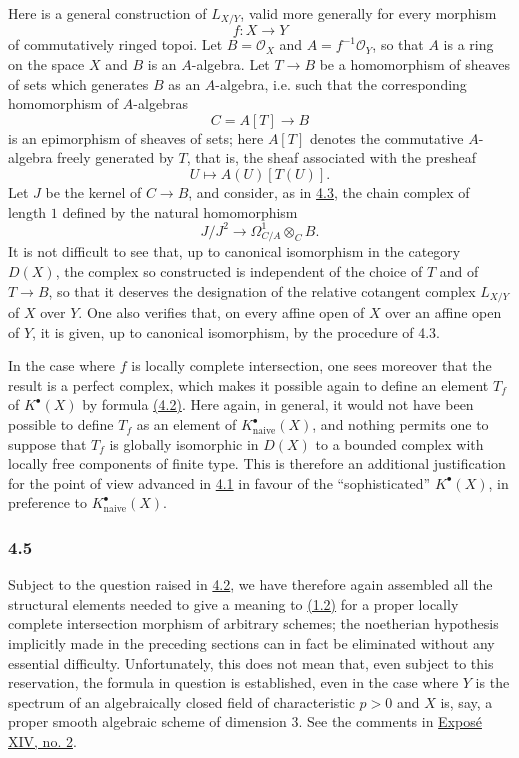 Here is a general construction of $L_{X/Y}$, valid more generally for every morphism
\[
f:X\longrightarrow Y
\]
of commutatively ringed topoi. Let $B=\mathcal O_X$ and $A=f^{-1}\mathcal O_Y$, so that $A$ is a ring on the space $X$ and $B$ is an $A$-algebra. Let $T\to B$ be a homomorphism of sheaves of sets which generates $B$ as an $A$-algebra, i.e. such that the corresponding homomorphism of $A$-algebras
\[
C=A[T]\longrightarrow B
\]
is an epimorphism of sheaves of sets; here $A[T]$ denotes the commutative $A$-algebra freely generated by $T$, that is, the sheaf associated with the presheaf
\[
U\longmapsto A(U)[T(U)].
\]
Let $J$ be the kernel of $C\to B$, and consider, as in \hyperlink{sga6.e00.sec.4.3}{4.3}, the chain complex of length $1$ defined by the natural homomorphism
\[
J/J^2\longrightarrow \Omega^1_{C/A}\otimes_C B.
\]
It is not difficult to see that, up to canonical isomorphism in the category $D(X)$, the complex so constructed is independent of the choice of $T$ and of $T\to B$, so that it deserves the designation of the relative cotangent complex $L_{X/Y}$ of $X$ over $Y$. One also verifies that, on every affine open of $X$ over an affine open of $Y$, it is given, up to canonical isomorphism, by the procedure of 4.3.

In the case where $f$ is locally complete intersection, one sees moreover that the result is a perfect complex, which makes it possible again to define an element $T_f$ of $K^\bullet(X)$ by formula \hyperlink{sga6.e00.eq.4-2}{(4.2)}. Here again, in general, it would not have been possible to define $T_f$ as an element of $K^\bullet_{\mathrm{naive}}(X)$, and nothing permits one to suppose that $T_f$ is globally isomorphic in $D(X)$ to a bounded complex with locally free components of finite type. This is therefore an additional justification for the point of view advanced in \hyperlink{sga6.e00.sec.4.1}{4.1} in favour of the ``sophisticated'' $K^\bullet(X)$, in preference to $K^\bullet_{\mathrm{naive}}(X)$.

\subsubsection*{4.5}
Subject to the question raised in \hyperlink{sga6.e00.sec.4.2}{4.2}, we have therefore again assembled all the structural elements needed to give a meaning to \hyperlink{sga6.e00.eq.1-2}{(1.2)} for a proper locally complete intersection morphism of arbitrary schemes; the noetherian hypothesis implicitly made in the preceding sections can in fact be eliminated without any essential difficulty. Unfortunately, this does not mean that, even subject to this reservation, the formula in question is established, even in the case where $Y$ is the spectrum of an algebraically closed field of characteristic $p>0$ and $X$ is, say, a proper smooth algebraic scheme of dimension $3$. See the comments in \hyperlink{sga6.e14.sec.2}{Expos\'e XIV, no. 2}.

